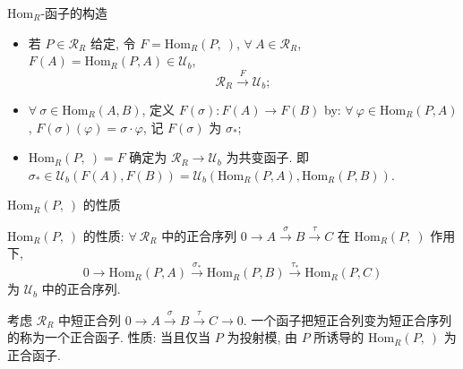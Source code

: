 
\begin{frame}{Hom$_R$-函子的构造}

\begin{itemize}
\item {} 若 $P \in \mathcal{R}_R$ 给定, 令 $F = \mathrm{Hom}_R(P,\ )$,
  $\forall\ A \in \mathcal{R}_R$, $F(A) = \mathrm{Hom}_R(P, A) \in \mathcal{U}_b$,
  \[
  \mathcal{R}_R \xrightarrow{\ F\ } \mathcal{U}_b;
  \]
\item {} $\forall\ \sigma \in \mathrm{Hom}_R(A, B)$, 定义
  $F(\sigma): F(A) \to F(B)$ by: $\forall\ \varphi \in \mathrm{Hom}_R(P, A)$,
  $F(\sigma)(\varphi) = \sigma \cdot \varphi$, 记 $F(\sigma)$ 为 $\sigma_*$;
\item {} $\mathrm{Hom}_R(P,\ ) = F$ 确定为 $\mathcal{R}_R \to
\mathcal{U}_b$ 为共变函子.
  即 $\sigma_* \in \mathcal{U}_b(F(A), F(B))
  = \mathcal{U}_b(\mathrm{Hom}_R(P, A), \mathrm{Hom}_R(P, B))$.
\end{itemize}

\end{frame}


\begin{frame}{Hom$_R(P,\ )$ 的性质}

$\mathrm{Hom}_R(P,\ )$ 的性质:
$\forall\ \mathcal{R}_R$ 中的正合序列
$0 \to A \xrightarrow{\ \sigma\ } B \xrightarrow{\ \tau\ } C$
在 $\mathrm{Hom}_R(P,\ )$ 作用下,
\[
0 \to \mathrm{Hom}_R(P, A) \xrightarrow{\ \sigma_*\ }
\mathrm{Hom}_R(P, B) \xrightarrow{\ \tau_*\ } \mathrm{Hom}_R(P, C)
\]
为 $\mathcal{U}_b$ 中的正合序列.

\pause

考虑 $\mathcal{R}_R$ 中短正合列
$0 \to A \xrightarrow{\ \sigma\ } B \xrightarrow{\ \tau\ } C \to 0$.
一个函子把短正合列变为短正合序列的称为一个正合函子.
性质: 当且仅当 $P$ 为投射模, 由 $P$ 所诱导的 $\mathrm{Hom}_R(P,\ )$
为正合函子.

\end{frame}



